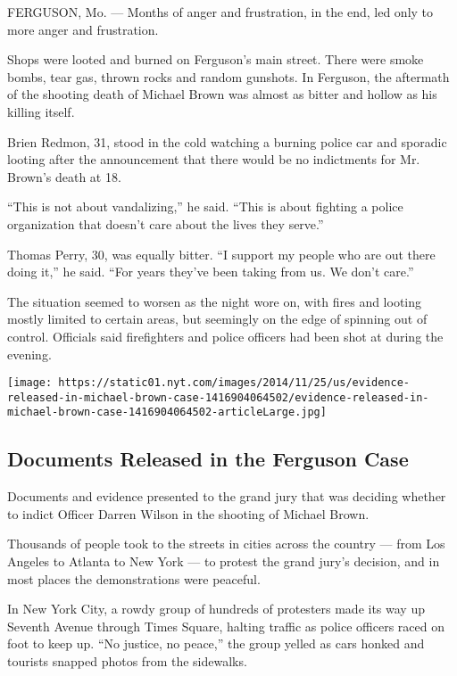 FERGUSON, Mo. --- Months of anger and frustration, in the end, led only
to more anger and frustration.

Shops were looted and burned on Ferguson's main street. There were smoke
bombs, tear gas, thrown rocks and random gunshots. In Ferguson, the
aftermath of the shooting death of Michael Brown was almost as bitter
and hollow as his killing itself.

Brien Redmon, 31, stood in the cold watching a burning police car and
sporadic looting after the announcement that there would be no
indictments for Mr. Brown's death at 18.

``This is not about vandalizing,'' he said. ``This is about fighting a
police organization that doesn't care about the lives they serve.''

Thomas Perry, 30, was equally bitter. ``I support my people who are out
there doing it,'' he said. ``For years they've been taking from us. We
don't care.''

The situation seemed to worsen as the night wore on, with fires and
looting mostly limited to certain areas, but seemingly on the edge of
spinning out of control. Officials said firefighters and police officers
had been shot at during the evening.

\href{https://www.nytimes.com/interactive/2014/11/25/us/evidence-released-in-michael-brown-case.html}{}

\texttt{[image: https://static01.nyt.com/images/2014/11/25/us/evidence-released-in-michael-brown-case-1416904064502/evidence-released-in-michael-brown-case-1416904064502-articleLarge.jpg]}

\hypertarget{documents-released-in-the-ferguson-case}{%
\subsection{Documents Released in the Ferguson
Case}\label{documents-released-in-the-ferguson-case}}

Documents and evidence presented to the grand jury that was deciding
whether to indict Officer Darren Wilson in the shooting of Michael
Brown.

Thousands of people took to the streets in cities across the country ---
from Los Angeles to Atlanta to New York --- to protest the grand jury's
decision, and in most places the demonstrations were peaceful.

In New York City, a rowdy group of hundreds of protesters made its way
up Seventh Avenue through Times Square, halting traffic as police
officers raced on foot to keep up. ``No justice, no peace,'' the group
yelled as cars honked and tourists snapped photos from the sidewalks.

